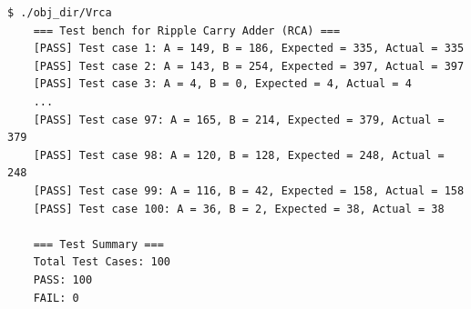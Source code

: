 \begin{lstlisting}[style = C, caption={Kết quả của test}]
	$ ./obj_dir/Vrca
	=== Test bench for Ripple Carry Adder (RCA) ===
	[PASS] Test case 1: A = 149, B = 186, Expected = 335, Actual = 335
	[PASS] Test case 2: A = 143, B = 254, Expected = 397, Actual = 397
	[PASS] Test case 3: A = 4, B = 0, Expected = 4, Actual = 4
	...
	[PASS] Test case 97: A = 165, B = 214, Expected = 379, Actual = 379
	[PASS] Test case 98: A = 120, B = 128, Expected = 248, Actual = 248
	[PASS] Test case 99: A = 116, B = 42, Expected = 158, Actual = 158
	[PASS] Test case 100: A = 36, B = 2, Expected = 38, Actual = 38
	
	=== Test Summary ===
	Total Test Cases: 100
	PASS: 100
	FAIL: 0
\end{lstlisting}
